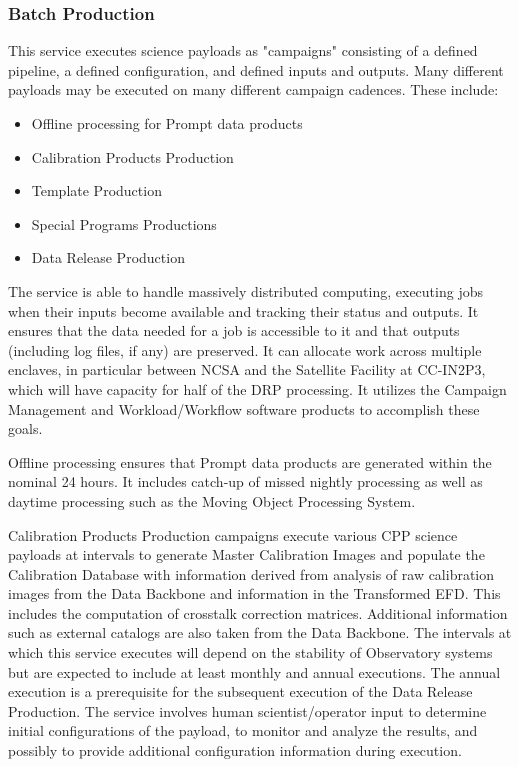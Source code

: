 \documentclass[DM,toc,lsstdraft]{lsstdoc}
\begin{document}
\subsubsection{Batch Production}\label{batch-production}

This service executes science payloads as "campaigns" consisting of a defined pipeline, a defined configuration, and defined inputs and outputs.
Many different payloads may be executed on many different campaign cadences.
These include:
\begin{itemize}
	\item Offline processing for Prompt data products
	\item Calibration Products Production
	\item Template Production
	\item Special Programs Productions
	\item Data Release Production
\end{itemize}

The service is able to handle massively distributed computing, executing jobs when their inputs become available and tracking their status and outputs.
It ensures that the data needed for a job is accessible to it and that outputs (including log files, if any) are preserved.
It can allocate work across multiple enclaves, in particular between NCSA and the Satellite Facility at CC-IN2P3, which will have capacity for half of the DRP processing.
It utilizes the Campaign Management and Workload/Workflow software products to accomplish these goals.

Offline processing ensures that Prompt data products are generated within the nominal 24 hours.
It includes catch-up of missed nightly processing as well as daytime processing such as the Moving Object Processing System.

Calibration Products Production campaigns execute various CPP science payloads at intervals to
generate Master Calibration Images and populate the Calibration Database
with information derived from analysis of raw calibration images from
the Data Backbone and information in the Transformed EFD. This includes
the computation of crosstalk correction matrices.
Additional information such as external catalogs are also
taken from the Data Backbone. The intervals at which this service
executes will depend on the stability of Observatory systems but are
expected to include at least monthly and annual executions. The annual
execution is a prerequisite for the subsequent execution of the Data
Release Production. The service involves human scientist/operator input
to determine initial configurations of the payload, to monitor and
analyze the results, and possibly to provide additional configuration
information during execution.
\end{document}
